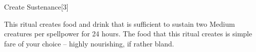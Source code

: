 \begin{spellsection}{Create Sustenance}[3]

\begin{spellcontent}

\begin{spelltargetinginfo}



\end{spelltargetinginfo}


\begin{spelleffects}



\spelleffect
This ritual creates food and drink that is sufficient to sustain two Medium creatures per spellpower for 24 hours.
The food that this ritual creates is simple fare of your choice -- highly nourishing, if rather bland.








\end{spelleffects}

\end{spellcontent}
\begin{spellfooter}


\end{spellfooter}
\begin{spellsubcontent}


\end{spellsubcontent}
\end{spellsection}


